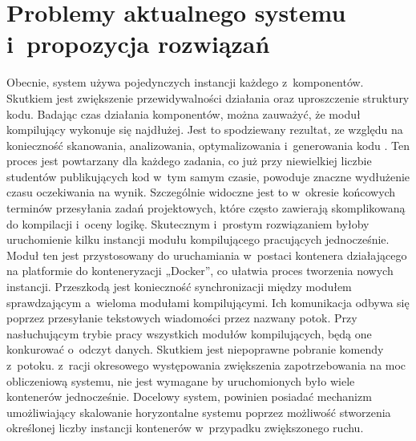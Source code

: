 \section{Problemy aktualnego systemu i~propozycja rozwiązań}
\indent Obecnie, system używa pojedynczych instancji każdego z~komponentów. Skutkiem jest zwiększenie przewidywalności działania oraz uproszczenie struktury kodu. Badając czas działania komponentów, można zauważyć, że moduł kompilujący wykonuje się najdłużej. Jest to spodziewany rezultat, ze względu na konieczność skanowania, analizowania, optymalizowania i~generowania kodu \cite{procesKompilacji}. Ten proces jest powtarzany dla każdego zadania, co już przy niewielkiej liczbie studentów publikujących kod w~tym samym czasie, powoduje znaczne wydłużenie czasu oczekiwania na wynik. Szczególnie widoczne jest to w~okresie końcowych terminów przesyłania zadań projektowych, które często zawierają skomplikowaną do kompilacji i~oceny logikę. Skutecznym i~prostym rozwiązaniem byłoby uruchomienie kilku instancji modułu kompilującego pracujących jednocześnie. Moduł ten jest przystosowany do uruchamiania w~postaci kontenera działającego na platformie do konteneryzacji „Docker”, co ułatwia proces tworzenia nowych instancji. Przeszkodą jest konieczność synchronizacji między modułem sprawdzającym a~wieloma modułami kompilującymi. Ich komunikacja odbywa się poprzez przesyłanie tekstowych wiadomości przez nazwany potok. Przy nasłuchującym trybie pracy wszystkich modułów kompilujących, będą one konkurować o~odczyt danych. Skutkiem jest niepoprawne pobranie komendy z~potoku. z~racji okresowego występowania zwiększenia zapotrzebowania na moc obliczeniową systemu, nie jest wymagane by uruchomionych było wiele kontenerów jednocześnie. Docelowy system, powinien posiadać mechanizm umożliwiający skalowanie horyzontalne systemu poprzez możliwość stworzenia określonej liczby instancji kontenerów w~przypadku zwiększonego ruchu.
